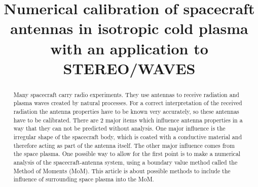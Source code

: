 \documentclass[two-column,ras]{agutex}
\begin{document}
%
%


\title{Numerical calibration of spacecraft antennas in isotropic cold plasma with an application to STEREO/WAVES}
%

%
%









%
%


\begin{abstract}
Many spacecraft carry radio experiments. They use antennas to receive radiation and plasma waves created by natural processes. For a correct interpretation of the received radiation the antenna properties have to be known very accurately, so these antennas have to be calibrated. There are 2 major items which influence antenna properties in a way that they can not be predicted without analysis. One major influence is the irregular shape of the spacecraft body, which is coated with a conductive material and therefore acting as part of the antenna itself. The other major influence comes from the space plasma. One possible way to allow for the first point is to make a numerical analysis of the spacecraft-antenna system, using a boundary value method called the Method of Moments (MoM). This article is about possible methods to include the influence of surrounding space plasma into the MoM.
\end{abstract}
\end{document}

